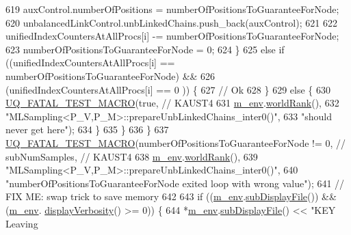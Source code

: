 \begin{DoxyCode}
619         auxControl.numberOfPositions = numberOfPositionsToGuaranteeForNode;
620         unbalancedLinkControl.unbLinkedChains.push\_back(auxControl);
621 
622         unifiedIndexCountersAtAllProcs[i] -= numberOfPositionsToGuaranteeForNode;
623         numberOfPositionsToGuaranteeForNode = 0;
624       \}
625       \textcolor{keywordflow}{else} \textcolor{keywordflow}{if} ((unifiedIndexCountersAtAllProcs[i] == numberOfPositionsToGuaranteeForNode) &&
626                (unifiedIndexCountersAtAllProcs[i] == 0                                  )) \{
627         \textcolor{comment}{// Ok}
628       \}
629       \textcolor{keywordflow}{else} \{
630         \hyperlink{_defines_8h_a56d63d18d0a6d45757de47fcc06f574d}{UQ\_FATAL\_TEST\_MACRO}(\textcolor{keyword}{true}, \textcolor{comment}{// KAUST4}
631                             \hyperlink{class_q_u_e_s_o_1_1_m_l_sampling_a13f1ca4fe9f94822fe572a743eaced1d}{m\_env}.\hyperlink{class_q_u_e_s_o_1_1_base_environment_a78b57112bbd0e6dd0e8afec00b40ffa7}{worldRank}(),
632                             \textcolor{stringliteral}{"MLSampling<P\_V,P\_M>::prepareUnbLinkedChains\_inter0()"},
633                             \textcolor{stringliteral}{"should never get here"});
634       \}
635     \}
636   \}
637   \hyperlink{_defines_8h_a56d63d18d0a6d45757de47fcc06f574d}{UQ\_FATAL\_TEST\_MACRO}(numberOfPositionsToGuaranteeForNode != 0, \textcolor{comment}{// subNumSamples, //
       KAUST4}
638                       \hyperlink{class_q_u_e_s_o_1_1_m_l_sampling_a13f1ca4fe9f94822fe572a743eaced1d}{m\_env}.\hyperlink{class_q_u_e_s_o_1_1_base_environment_a78b57112bbd0e6dd0e8afec00b40ffa7}{worldRank}(),
639                       \textcolor{stringliteral}{"MLSampling<P\_V,P\_M>::prepareUnbLinkedChains\_inter0()"},
640                       \textcolor{stringliteral}{"numberOfPositionsToGuaranteeForNode exited loop with wrong value"});
641   \textcolor{comment}{// FIX ME: swap trick to save memory}
642 
643   \textcolor{keywordflow}{if} ((\hyperlink{class_q_u_e_s_o_1_1_m_l_sampling_a13f1ca4fe9f94822fe572a743eaced1d}{m\_env}.\hyperlink{class_q_u_e_s_o_1_1_base_environment_a8a0064746ae8dddfece4229b9ad374d6}{subDisplayFile}()) && (\hyperlink{class_q_u_e_s_o_1_1_m_l_sampling_a13f1ca4fe9f94822fe572a743eaced1d}{m\_env}.
      \hyperlink{class_q_u_e_s_o_1_1_base_environment_a1fe5f244fc0316a0ab3e37463f108b96}{displayVerbosity}() >= 0)) \{
644     *\hyperlink{class_q_u_e_s_o_1_1_m_l_sampling_a13f1ca4fe9f94822fe572a743eaced1d}{m\_env}.\hyperlink{class_q_u_e_s_o_1_1_base_environment_a8a0064746ae8dddfece4229b9ad374d6}{subDisplayFile}() << \textcolor{stringliteral}{"KEY Leaving
}
\end{DoxyCode}
